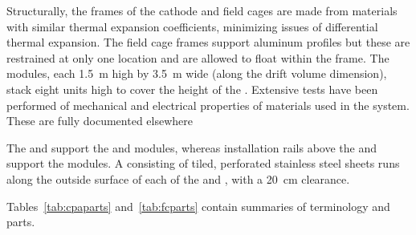 Structurally, the frames of the cathode and field cages are made from materials with similar thermal expansion coefficients, minimizing issues of differential thermal expansion. The field cage frames support aluminum profiles but these are restrained at only one location and are allowed to float within the frame.
The  modules, each \SI{1.5}{\m} high by \SI{3.5}{\m} wide (along the drift volume dimension), stack eight units high to cover the \tpcheight{} height of the .  
Extensive tests have been performed of mechanical and electrical properties of materials used in the  system.  These are fully documented elsewhere

The  and  support the  and  modules, whereas
installation rails above the  and  support the  modules. 
A  consisting of tiled, perforated stainless steel sheets %
runs along the outside surface of each of the %
 and , with a \SI{20}{\centi\meter} clearance. 

Tables~\ref{tab:cpaparts} and~\ref{tab:fcparts} contain summaries of terminology and parts.

